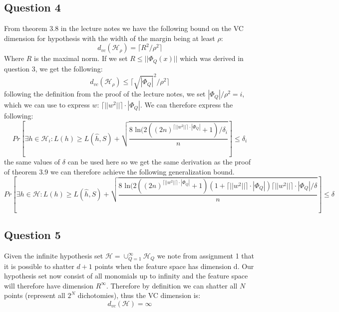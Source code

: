 \documentclass{article}
\begin{document}
\subsection{Question 4}
From theorem 3.8 in the lecture notes we have the following bound on the VC dimension for hypothesis with the width of the margin being at least $\rho$:
\begin{equation}
d_{vc}(\mathcal{H}_\rho) = \lceil R^2 / \rho^2 \rceil
\end{equation}
Where $R$ is the maximal norm. If we set $R \leq || \Phi_Q(x)||$ which was derived in question 3, we get the following:
\begin{equation}
d_{vc}(\mathcal{H}_\rho) \leq \lceil \sqrt{| \Phi_Q|}^2  / \rho^2 \rceil
\end{equation}
following the definition from the proof of the lecture notes, we set $
| \Phi_Q| / \rho^2 = i$, which we can use to express $w$: $\lceil || w^2|| \rceil \cdot| \Phi_Q|$. We can therefore express the following:
\begin{equation}
Pr \left[ \exists h \in \mathcal{H}_i: L(h) \geq L(\hat{h},S)+
\sqrt{ \dfrac{8 \text{ ln} (2((2n)^{\lceil || w^2|| \rceil \cdot| \Phi_Q|}+1) / \delta_i}{n}} \right] \leq \delta_i 
\end{equation}
the same values of $\delta$ can be used here so we get the same derivation as the proof of theorem 3.9 we can therefore achieve the following generalization bound.
\begin{equation}
Pr \left[ \exists h \in \mathcal{H}: L(h) \geq L(\hat{h},S)+
\sqrt{ \dfrac{8 \text{ ln} (2((2n)^{\lceil || w^2|| \rceil \cdot| \Phi_Q|}+1) (1+ \lceil || w^2|| \rceil \cdot| \Phi_Q|) \lceil || w^2|| \rceil \cdot| \Phi_Q|  / \delta}{n}} \right] \leq \delta
\end{equation}
\subsection{Question 5}
Given the infinite hypothesis set $\mathcal{H} = \cup_{Q=1}^\infty \mathcal{H}_Q$ we note from assignment 1 that it is possible to shatter $d+1$ points when the feature space has dimension d. Our hypothesis set now consist of all monomials  up to infinity and the feature space will therefore have dimension $R^\infty$. Therefore by definition we can shatter all $N$ points (represent all $2^N$ dichotomies), thus the VC dimension is:
$$ d_{vc}(\mathcal{H}) = \infty $$
\end{document}
